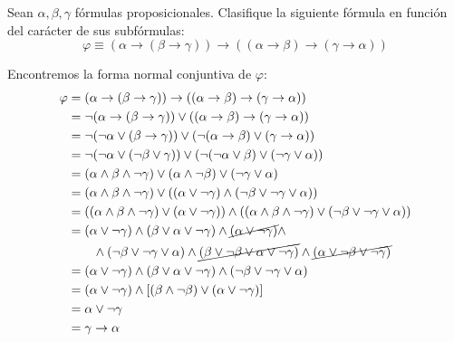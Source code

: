 \begin{ejercicio}
    Sean $\alpha,\beta,\gamma$ fórmulas proposicionales. Clasifique la siguiente fórmula en función del carácter de sus subfórmulas:
    \begin{equation*}
        \varphi \equiv (\alpha\rightarrow(\beta\rightarrow \gamma))\rightarrow((\alpha\rightarrow \beta)\rightarrow(\gamma\rightarrow \alpha))
    \end{equation*}

    Encontremos la forma normal conjuntiva de $\varphi$:
    \begin{align*}
        \varphi &= (\alpha\rightarrow(\beta\rightarrow \gamma))\rightarrow((\alpha\rightarrow \beta)\rightarrow(\gamma\rightarrow \alpha))\\
        &= \lnot (\alpha\rightarrow(\beta\rightarrow \gamma))\lor((\alpha\rightarrow \beta)\rightarrow(\gamma\rightarrow \alpha))\\
        &= \lnot (\lnot \alpha\lor(\beta\rightarrow \gamma))\lor(\lnot (\alpha\rightarrow \beta)\lor(\gamma\rightarrow \alpha))\\
        &= \lnot (\lnot \alpha\lor(\lnot \beta\lor \gamma))\lor(\lnot (\lnot \alpha\lor \beta)\lor(\lnot \gamma\lor \alpha))\\
        &= (\alpha\land \beta \land \lnot \gamma)\lor (\alpha\land \lnot \beta)\lor (\lnot \gamma\lor \alpha) \\
        &= (\alpha\land \beta \land \lnot \gamma)\lor \left((\alpha\lor \lnot \gamma) \land (\lnot \beta\lor \lnot \gamma \lor \alpha)\right)\\
        &= \left((\alpha\land \beta \land \lnot \gamma)\lor (\alpha\lor \lnot \gamma)\right) \land \left((\alpha\land \beta \land \lnot \gamma)\lor (\lnot \beta\lor \lnot \gamma \lor \alpha)\right)\\
        &= (\alpha\lor \lnot \gamma) \land (\beta \lor \alpha\lor \lnot \gamma) \land \cancel{(\alpha\lor \lnot \gamma)} \land\\&\qquad \land (\lnot \beta\lor \lnot \gamma \lor \alpha) \land \cancel{(\beta \lor \lnot \beta \lor \alpha\lor \lnot \gamma)} \land \cancel{(\alpha\lor \lnot \beta \lor \lnot \gamma)}\\
        &= (\alpha\lor \lnot \gamma) \land (\beta \lor \alpha\lor \lnot \gamma) \land (\lnot \beta\lor \lnot \gamma \lor \alpha)\\
        &= (\alpha\lor \lnot \gamma) \land [(\beta \land \lnot \beta) \lor (\alpha \lor \lnot \gamma)]\\
        &= \alpha\lor \lnot \gamma\\
        &= \gamma \rightarrow \alpha
    \end{align*}


\end{ejercicio}
